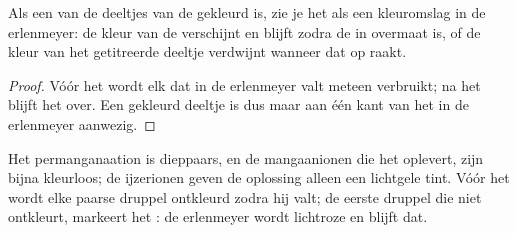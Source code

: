 \begin{proposition}\label{prop:g11:titration:colour}
Als een van de deeltjes van de  gekleurd is, zie je het
 als een kleuromslag in de erlenmeyer: de kleur van de
 verschijnt en blijft zodra de  in overmaat is, of de
kleur van het getitreerde deeltje verdwijnt wanneer dat op raakt.
\end{proposition}

\begin{proof}
Vóór het  wordt elk   dat in de erlenmeyer valt
meteen verbruikt; na het  blijft het over. Een gekleurd
deeltje is dus maar aan één kant van het  in de
erlenmeyer aanwezig.
\end{proof}

\begin{example}\label{ex:g11:titration:permanganate}
Het permanganaation  is dieppaars, en de mangaanionen
 die het oplevert, zijn bijna kleurloos; de ijzerionen geven
de oplossing alleen een lichtgele tint. Vóór het  wordt
elke paarse druppel ontkleurd zodra hij valt; de eerste druppel die niet
ontkleurt, markeert het : de erlenmeyer wordt lichtroze
en blijft dat.
\end{example}

